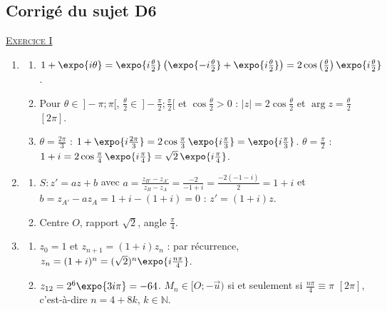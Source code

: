 \begin{corrige}
\subsection{Corrig\'e du sujet D6}
\noindent \underline{\textsc{Exercice I}}
\begin{enumerate}
\item \begin{enumerate}
      \item $1 + \expo{i\theta} = \expo{i\frac{\theta}{2}}\left(\expo{-i\frac{\theta}{2}} + \expo{i\frac{\theta}{2}}\right) = 2\cos\left(\frac{\theta}{2}\right)\expo{i\frac{\theta}{2}}$.
      \item Pour $\theta \in\ ]-\pi ; \pi[$, $\frac{\theta}{2} \in\ ]-\frac{\pi}{2} ; \frac{\pi}{2}[$ et $\cos\frac{\theta}{2} > 0$ :
            $|z| = 2\cos\frac{\theta}{2}$ et $\arg z = \frac{\theta}{2}$ $[2\pi]$.
      \item $\theta = \frac{2\pi}{3}$ : $1 + \expo{i\frac{2\pi}{3}} = 2\cos\frac{\pi}{3}\,\expo{i\frac{\pi}{3}} = \expo{i\frac{\pi}{3}}$.
            $\theta = \frac{\pi}{2}$ : $1 + i = 2\cos\frac{\pi}{4}\,\expo{i\frac{\pi}{4}} = \sqrt{2}\,\expo{i\frac{\pi}{4}}$.
      \end{enumerate}
\item \begin{enumerate}
      \item $S : z' = az + b$ avec $a = \frac{z_{B'} - z_{A'}}{z_B - z_A} = \frac{-2}{-1 + i} = \frac{-2(-1 - i)}{2} = 1 + i$ et
            $b = z_{A'} - a z_A = 1 + i - (1 + i) = 0$ : $z' = (1 + i)z$.
      \item Centre $O$, rapport $\sqrt{2}$, angle $\frac{\pi}{4}$.
      \end{enumerate}
\item \begin{enumerate}
      \item $z_0 = 1$ et $z_{n+1} = (1 + i)z_n$ : par r\'ecurrence, $z_n = (1 + i)^n = (\sqrt{2})^n\expo{i\frac{n\pi}{4}}$.
      \item $z_{12} = 2^6\expo{3i\pi} = -64$. $M_n \in [O ; -\vec{u})$ si et seulement si $\frac{n\pi}{4} \equiv \pi$ $[2\pi]$,
            c'est-\`a-dire $n = 4 + 8k$, $k \in \mathbb{N}$.
      \end{enumerate}
\end{enumerate}


\end{corrige}
